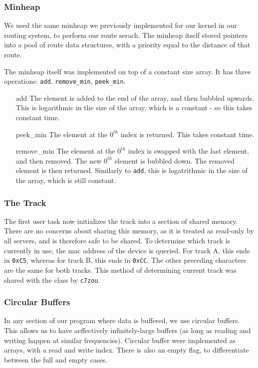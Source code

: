 \documentclass{article}
\begin{document}
\subsubsection{Minheap}
    We used the same minheap we previously implemented for our kernel in our routing system, to perform our route serach. The minheap itself stored pointers into a pool of route data structures, with a priority equal to the distance of that route. 

    The minheap itself was implemented on top of a constant size array. It has three operations: \verb|add|, \verb|remove_min|, \verb|peek_min|.
\begin{enumerate}
    \item[add] The element is added to the end of the array, and then bubbled upwards. This is logarithmic in the size of the array, which is a constant - so this takes constant time.
    \item[peek\_min] The element at the $0^{th}$ index is returned. This takes constant time.
    \item[remove\_min] The element at the $0^{th}$ index is swapped with the last element, and then removed. The new $0^{th}$ element is bubbled down. The removed element is then returned.
    Similarly to \verb|add|, this is logatrithmic in the size of the array, which is still constant.
\end{enumerate}

\subsubsection{The Track}
    The first user task now initializes the track into a section of shared memory. There are no concerns about sharing this memory, as it is treated as read-only by all servers, and is therefore safe to be shared. 
    To determine which track is currently in use, the mac address of the device is queried. For track A, this ends in \texttt{0xC5}, whereas for track B, this ends in \texttt{0xCC}. 
    The other preceding characters are the same for both tracks. 
    This method of determining current track was shared with the class by \verb|c7zou|.

\subsubsection{Circular Buffers}
    In any section of our program where data is buffered, we use circular buffers. This allows us to have aeffectively infinitely-large buffers (as long as reading and writing happen at similar frequencies). Circular buffer were implemented as arrays, with a read and write index. There is also an empty flag, to differentiate between the full and empty cases.
\end{document}
